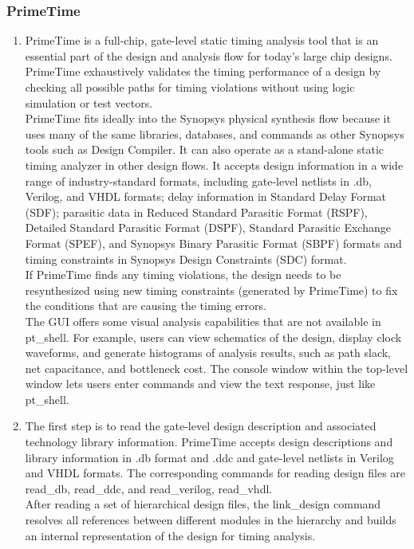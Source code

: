 \documentclass[a4paper,12pt,twoside]{article}
\begin{document}
\subsubsection{PrimeTime}
\begin{enumerate}
    \item PrimeTime is a full-chip, gate-level static timing analysis tool that is an essential part of the design and analysis flow for today’s large chip designs. PrimeTime exhaustively validates the timing performance of a design by checking all possible paths for timing violations without using logic simulation or test vectors.\\
    PrimeTime fits ideally into the Synopsys physical synthesis flow because it uses many of the same libraries, databases, and commands as other Synopsys tools such as Design Compiler. It can also operate as a stand-alone static timing analyzer in other design flows. It accepts design information in a wide range of industry-standard formats, including gate-level netlists in .db, Verilog, and VHDL formats; delay information in Standard Delay Format (SDF); parasitic data in Reduced Standard Parasitic Format (RSPF), Detailed Standard Parasitic Format (DSPF), Standard Parasitic Exchange Format (SPEF), and Synopsys Binary Parasitic Format (SBPF) formats and timing constraints in Synopsys Design Constraints (SDC) format.\\
    If PrimeTime finds any timing violations, the design needs to be resynthesized using new timing constraints (generated by PrimeTime) to fix the conditions that are causing the timing errors.\\
    The GUI offers some visual analysis capabilities that are not available in pt\_shell. For example, users can view schematics of the design, display clock waveforms, and generate histograms of analysis results, such as path slack, net capacitance, and bottleneck cost. The console window within the top-level window lets users enter commands and view the text response, just like pt\_shell.
    \item The first step is to read the gate-level design description and associated technology library information. PrimeTime accepts design descriptions and library information in .db format and .ddc and gate-level netlists in Verilog and VHDL formats. The corresponding commands for reading design files are read\_db, read\_ddc, and read\_verilog, read\_vhdl.\\
    After reading a set of hierarchical design files, the link\_design command resolves all references between different modules in the hierarchy and builds an internal representation of the design for timing analysis.\\

\end{enumerate}
\end{document}
